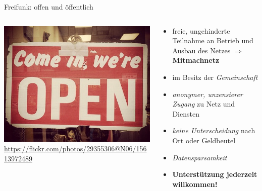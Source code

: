 \documentclass[10pt]{beamer}
\begin{document}
    \begin{frame}{Freifunk: offen und öffentlich}
      \begin{columns}[c]
        \begin{column}{5cm}
          \includegraphics[width=\textwidth]{images/open}
          \newline \tiny \url{https://flickr.com/photos/29355306@N06/15613972489}
        \end{column}
        \begin{column}{7cm}
          \begin{itemize}
            \item freie, ungehinderte Teilnahme an Betrieb und Ausbau des Netzes $\Rightarrow$ \textbf{Mitmachnetz}
            \item im Besitz der \textit{Gemeinschaft}
            \item \textit{anonymer, unzensierer Zugang} zu Netz und Diensten
            \item \textit{keine Unterscheidung} nach Ort oder Geldbeutel
            \item \textit{Datensparsamkeit}
            \item \textbf{Unterstützung jederzeit willkommen!}
          \end{itemize}
        \end{column}
      \end{columns}
    \end{frame}
\end{document}
